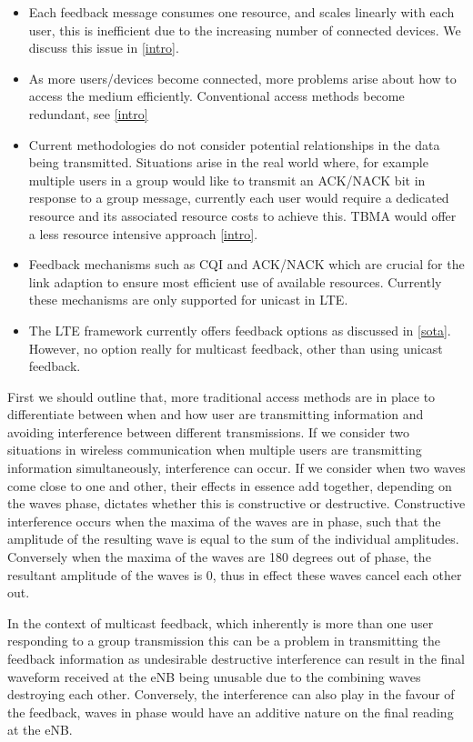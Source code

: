 \documentclass{article}
\begin{document}
\begin{itemize}
  \item Each feedback message consumes one resource, and scales linearly with each user, this is inefficient due to the increasing number of connected devices. We discuss this issue in \cref{intro}.
  \item As more users/devices become connected, more problems arise about how to access the medium efficiently. Conventional access methods become redundant, see \cref{intro}
  \item Current methodologies do not consider potential relationships in the data being transmitted. Situations arise in the real world where, for example multiple users in a group would like to transmit an ACK/NACK bit in response to a group message, currently each user would require a dedicated resource and its associated resource costs to achieve this. TBMA would offer a less resource intensive approach \cref{intro}. 
  \item Feedback mechanisms such as CQI and ACK/NACK which are crucial for the link adaption to ensure most efficient use of available resources. Currently these mechanisms are only supported for unicast in LTE. 
  \item The LTE framework currently offers feedback options as discussed in \cref{sota}. However, no option really for multicast feedback, other than using unicast feedback.
\end{itemize}

First we should outline that, more traditional access methods are in place to differentiate between when and how user are transmitting information and avoiding interference between different transmissions. If we consider two situations in wireless communication when multiple users are transmitting information simultaneously, interference can occur. If we consider when two waves come close to one and other, their effects in essence add together, depending on the waves phase, dictates whether this is constructive or destructive. Constructive interference occurs when the maxima of the waves are in phase, such that the amplitude of the resulting wave is equal to the sum of the individual amplitudes. Conversely when the maxima of the waves are 180 degrees out of phase, the resultant amplitude of the waves is 0, thus in effect these waves cancel each other out. 

In the context of multicast feedback, which inherently is more than one user responding to a group transmission this can be a problem in transmitting the feedback information as undesirable destructive interference can result in the final waveform received at the eNB being unusable due to the combining waves destroying each other. Conversely, the interference can also play in the favour of the feedback, waves in phase would have an additive nature on the final reading at the eNB. 
\end{document}
